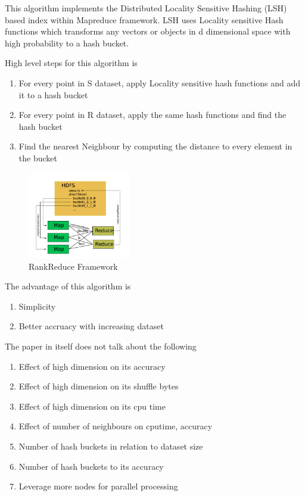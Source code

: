 \documentclass[conference]{IEEEtran}
\begin{document}
This algorithm implements the Distributed Locality Sensitive Hashing (LSH)
based index within Mapreduce framework. LSH uses Locality sensitive
Hash functions which transforms any vectors or objects in d
dimensional space with high probability to a hash bucket.

\bigskip

High level steps for this algorithm is
\begin{enumerate}
\item For every point in S dataset, apply Locality sensitive hash
  functions and add it to a hash bucket
\item For every point in R dataset, apply the same hash functions and
  find the hash bucket
\item Find the nearest Neighbour by computing the distance to every
  element in the bucket
\end{enumerate}


\begin{figure}[here]
\includegraphics[width=0.4\textwidth]{rankreduce.png}
\caption{RankReduce Framework}
\label{fig:rankreduce.png}
\end{figure}

\bigskip

The advantage of this algorithm is
\begin{enumerate}
\item Simplicity
\item Better accruacy with increasing dataset
\end{enumerate}

\bigskip

The paper in itself does not talk about the following
\begin{enumerate}
\item Effect of high dimension on its accuracy
\item Effect of high dimension on its shuffle bytes
\item Effect of high dimension on its cpu time
\item Effect of number of neighbours on cputime, accuracy
\item Number of hash buckets in relation to dataset size
\item Number of hash buckets to its accuracy
\item Leverage more nodes for parallel processing
\end{enumerate}
\end{document}
